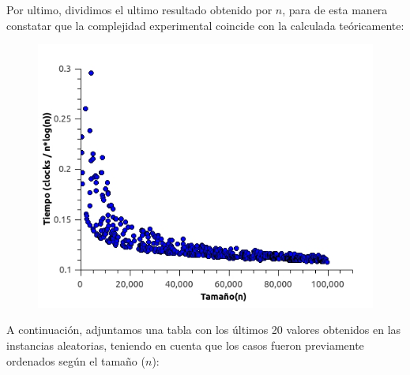 Por ultimo, dividimos el ultimo resultado obtenido por $n$, para de esta manera constatar que la complejidad experimental coincide con la calculada teóricamente:

\begin{figure}[H]
  \begin{center}
   \includegraphics[scale=0.66]{imagenes/grafico1-3.jpg}
  \end{center}
\end{figure}

A continuación, adjuntamos una tabla con los últimos 20 valores obtenidos en las instancias aleatorias, teniendo en cuenta que los casos fueron previamente ordenados según el tamaño ($n$):

